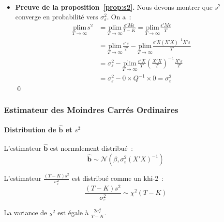 \documentclass[10pt]{beamer}
\begin{document}
\begin{notes}
\begin{itemize}
\item \textbf{Preuve de la proposition~\ref{prop:s2}.} Nous devons montrer que $s^2$ converge en probabilité vers $\sigma_{\varepsilon}^2$. On a~:
  \[
    \begin{split}
      \underset{T\to\infty}{\mathrm{plim}} s^2 &= \underset{T\to\infty}{\mathrm{plim}} \frac{\varepsilon' M \varepsilon}{T-K} = \underset{T\to\infty}{\mathrm{plim}} \frac{\varepsilon' M \varepsilon}{T}\\
                                               &= \underset{T\to\infty}{\mathrm{plim}} \frac{\varepsilon' \varepsilon}{T} - \underset{T\to\infty}{\mathrm{plim}} \frac{\varepsilon' X (X'X)^{-1}X'\varepsilon}{T}\\
                                               &= \sigma_{\varepsilon}^2 - \underset{T\to\infty}{\mathrm{plim}} \frac{\varepsilon'X}{T}\left( \frac{X'X}{T} \right)^{-1}\frac{X'\varepsilon}{T}\\
                                               &= \sigma_{\varepsilon}^2 - 0 \times Q^{-1} \times 0 = \sigma_{\varepsilon}^2
    \end{split}
  \]
\qed
\end{itemize}
\end{notes}


\begin{frame}
  \frametitle{Estimateur des Moindres Carrés Ordinaires}
  \framesubtitle {Distribution de $\hat{\mathbf b}$ et $s^2$}

  \begin{theorem}\label{thm:bhat:distribution}
    L'estimateur $\hat{\mathbf b}$ est normalement distribué~:
    \[
      \hat{\mathbf b} \sim \mathcal N\left( \beta, \sigma_{\varepsilon}^2(X'X)^{-1} \right)
    \]
  \end{theorem}


  \begin{theorem}\label{thm:s2:distribution}
    L'estimateur $\frac{(T-K)s^2}{\sigma_{\varepsilon}^2}$ est distribué comme un khi-2~:
    \[
      \frac{(T-K)s^2}{\sigma_{\varepsilon}^2} \sim \chi^2(T-K)
    \]
  \end{theorem}


  \begin{cor}\label{cor:s2:distribution}
    La variance de $s^2$ est égale à $\frac{2\sigma_{\varepsilon}^4}{T-K}$.
  \end{cor}

\end{frame}
\end{document}
